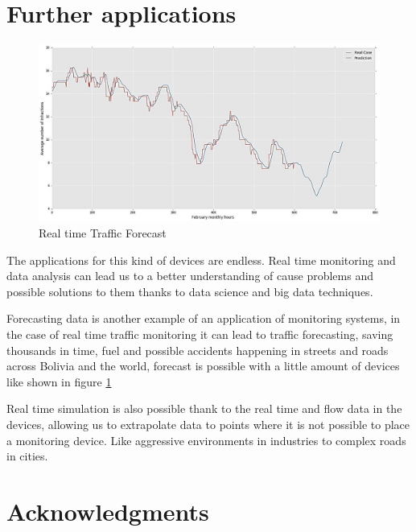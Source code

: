 \documentclass[fleqn,12pt]{SelfArx} %
\begin{document}


\section{Further applications}

\begin{figure}[h]\centering %
	\includegraphics[width=\linewidth]{images/data}
	\caption{Real time Traffic Forecast}
	\label{fig:forecast}
\end{figure}
 
The applications for this kind of devices are endless. Real time monitoring and data analysis can lead us to a better understanding of cause problems and possible solutions to them thanks to data science and big data techniques.

Forecasting data is another example of an application of monitoring systems, in the case of real time traffic monitoring it can lead to traffic forecasting, saving thousands in time, fuel and possible accidents happening in streets and roads across Bolivia and the world, forecast is possible with a little amount of devices like shown in figure \ref{fig:forecast}



Real time simulation is also possible thank to the real time and flow data in the devices, allowing us to extrapolate data to points where it is not possible to place a monitoring device. Like aggressive environments in industries to complex roads in cities.

\section*{Acknowledgments} %
\end{document}
